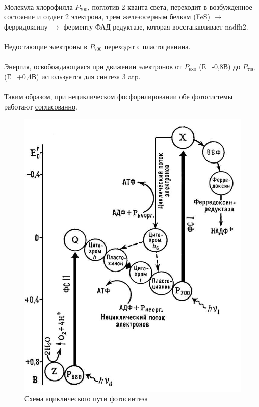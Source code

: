 \paragraph*{}Молекула хлорофилла $P_{700}$, поглотив 2 кванта света, переходит в возбужденное состояние и отдает 2 электрона, трем железосерным белкам (FeS) $\rightarrow$ ферридоксину $\rightarrow$ ферменту ФАД-редуктазе, которая восстанавливает \gls{nadfh2}. 

\paragraph*{}Недостающие электроны в $P_{700}$ переходят с пластоцианина.

\paragraph*{}Энергия, освобождающаяся при движении электронов от $P_{680}$ (Е=-0,8В)
до $P_{700}$ (Е=+0,4В) используется для синтеза 3 \gls{atp}.

\paragraph*{}Таким образом, при нециклическом фосфорилировании обе фотосистемы \hypertarget{photocooperation}{работают} \hyperlink{question_photocooperation}{согласованно}.

\begin{figure}
  \centering
       \includegraphics[width=0.4\linewidth]{pictures/acyclfosph}
\caption{Схема ациклического пути фотосинтеза}
\label{acyclfosph}
\end{figure}



